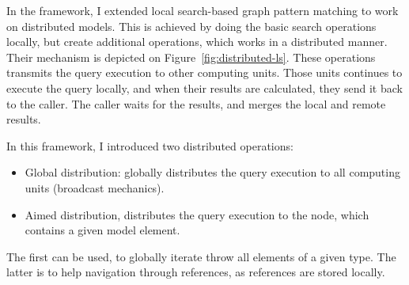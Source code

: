 In the framework, I extended local search-based graph pattern matching to work on distributed models.
This is achieved by doing the basic search operations locally, but create additional operations, which works in a distributed manner. 
Their mechanism is depicted on Figure~\ref{fig:distributed-ls}.
These operations transmits the query execution to other computing units.
Those units continues to execute the query locally, and when their results are calculated, they send it back to the caller.
The caller waits for the results, and merges the local and remote results.

In this framework, I introduced two distributed operations:
\begin{itemize}
	\item Global distribution: globally distributes the query execution to all computing units (broadcast mechanics).
	\item Aimed distribution, distributes the query execution to the node, which contains a given model element.
\end{itemize}

The first can be used, to globally iterate throw all elements of a given type. The latter is to help navigation through references, as references are stored locally.





